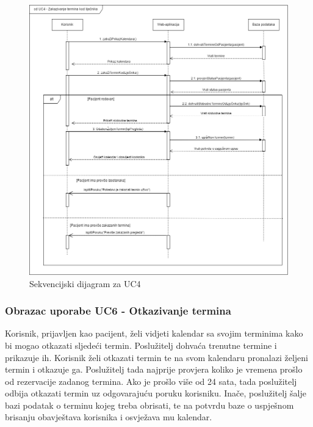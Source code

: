 				
				\begin{figure}[H]
			            \includegraphics[width=\textwidth]{slike/sd_uc4_v2.png} %
			            \caption{Sekvencijski dijagram za UC4}
			            \label{fig:promjene2} %
		            \end{figure}
		            
		        \eject
				
				\subsubsection{Obrazac uporabe UC6 - Otkazivanje termina}
				
				Korisnik, prijavljen kao pacijent, želi vidjeti kalendar sa svojim terminima kako bi mogao otkazati sljedeći termin. Poslužitelj dohvaća trenutne termine i prikazuje ih. Korisnik želi otkazati termin te na svom kalendaru pronalazi željeni termin i otkazuje ga. Poslužitelj tada najprije provjera koliko je vremena prošlo od rezervacije zadanog termina. Ako je prošlo više od 24 sata, tada poslužitelj odbija otkazati termin uz odgovarajuću poruku korisniku. Inače, poslužitelj šalje bazi podatak o terminu kojeg treba obrisati, te na potvrdu baze o uspješnom brisanju obavještava korisnika i osvježava mu kalendar.
				
